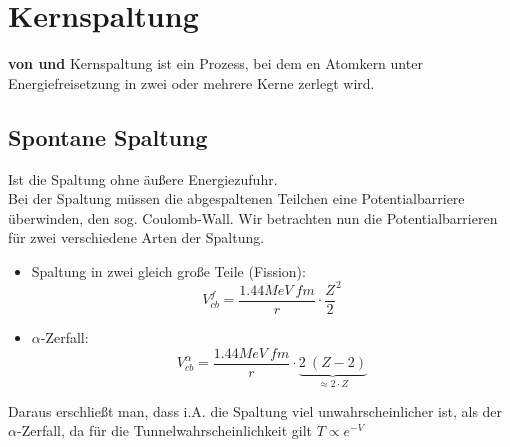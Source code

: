\documentclass[Ex4_Zusammenfassung.tex]{subfiles}
\begin{document}
\section{Kernspaltung}
\textbf{von \mitsch und \soeren} \newline 
Kernspaltung ist ein Prozess, bei dem en Atomkern unter Energiefreisetzung in zwei oder mehrere Kerne zerlegt wird.
\subsection{Spontane Spaltung}
Ist die Spaltung ohne äußere Energiezufuhr. \\
Bei der Spaltung müssen  die abgespaltenen Teilchen eine Potentialbarriere überwinden, den sog. Coulomb-Wall.
Wir betrachten nun die Potentialbarrieren für zwei verschiedene Arten der Spaltung.
\begin{itemize}
\item Spaltung in zwei gleich große Teile (Fission): 
		\begin{equation}
		V_{cb}^f = \frac{1.44 MeV \ fm}{r} \cdot \frac{Z}{2}^2
		\end{equation}
\item $\alpha$-Zerfall: 
		\begin{equation}
		V_{cb}^{\alpha} = \frac{1.44 MeV \ fm}{r} \cdot \underbrace{2 \ (Z-2)}_{\approx 2 \cdot Z}
		\end{equation}
\end{itemize}
Daraus erschließt man, dass i.A. die Spaltung viel unwahrscheinlicher ist, als der $\alpha$-Zerfall, da für die Tunnelwahrscheinlichkeit gilt $T \propto e^{-V}$ \\ 
\end{document}
